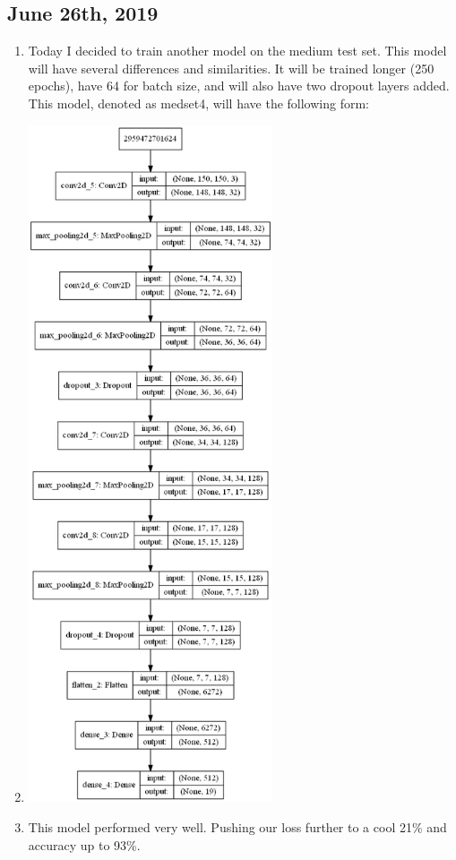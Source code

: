 \documentclass[12pt]{article} %
\begin{document}
\subsection{June 26th, 2019}
\noindent\makebox[\linewidth]{\rule{15cm}{0.4pt}}
\begin{enumerate}[label = (\roman*)]
\item Today I decided to train another model on the medium test set. This model will have several differences and similarities. It will be trained longer (250 epochs), have 64 for batch size, and will also have two dropout layers added. This model, denoted as medset4, will have the following form:
\item \includegraphics[height = 200mm, scale=.5]{model-medset4}
\item This model performed very well. Pushing our loss further to a cool 21\% and accuracy up to 93\%. 

\end{enumerate}
\end{document}
